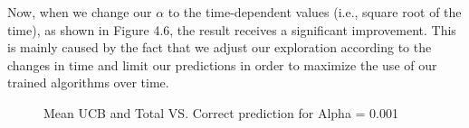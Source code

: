 Now, when we change our $\alpha$ to the time-dependent values (i.e., square root of the time), as shown in Figure 4.6, the result receives a significant improvement. This is mainly caused by the fact that we adjust our exploration according to the changes in time and limit our predictions in order to maximize the use of our trained algorithms over time.
\begin{figure}[htbp]
\centering
{}%
%
\centering
\caption{ Mean UCB and Total VS. Correct prediction for
Alpha = 0.001}
\end{figure}  
